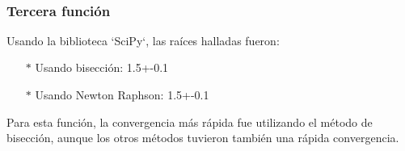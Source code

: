 \documentclass[titlepage,a4paper]{article}
\begin{document}
\\%

\subsubsection{Tercera función}\label{sec:CR3}

Usando la biblioteca `SciPy`, las raíces halladas fueron:
\begin{itemize}
    \item[$*$]Usando bisección:   1.5+-0.1
    \item[$*$]Usando Newton Raphson:  1.5+-0.1
\end{itemize}

Para esta función, la convergencia más rápida fue utilizando el método de bisección, aunque los otros métodos tuvieron también una rápida convergencia. 
\end{document}
